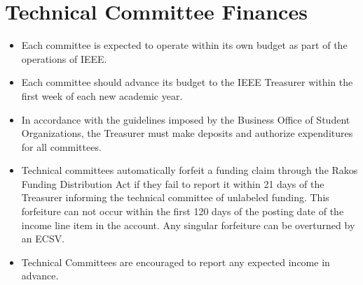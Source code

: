 \documentclass[12pt]{constitution}
\begin{document}
\section{Technical Committee Finances}
\label{sec:tech_budget}
\begin{itemize}
    \item Each committee is expected to operate within its own budget as part of the operations of IEEE.
    \item Each committee should advance its budget to the IEEE Treasurer within the first week of each new academic year.
    \item In accordance with the guidelines imposed by the Business Office of Student Organizations, the Treasurer must make deposits and authorize expenditures for all committees.
    \item Technical committees automatically forfeit a funding claim through the Rakos Funding Distribution Act if they fail to report it within 21 days of the Treasurer informing the technical committee of unlabeled funding. This forfeiture can not occur within the first 120 days of the posting date of the income line item in the account. Any singular forfeiture can be overturned by an ECSV.
    \item Technical Committees are encouraged to report any expected income in advance.
\end{itemize}
\end{document}
